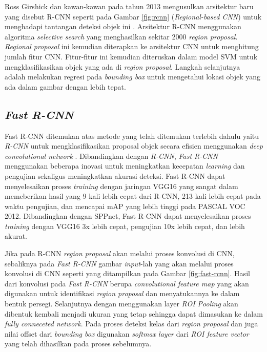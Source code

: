 Ross Girshick dan kawan-kawan pada tahun 2013 mengusulkan arsitektur baru yang disebut R-CNN seperti pada Gambar \ref{fig:rcnn} (\textit{Regional-based CNN}) untuk menghadapi tantangan deteksi objek ini \citep{rcnn}. Arsitektur R-CNN menggunakan algoritma \textit{selective search} yang menghasilkan sekitar 2000 \textit{region proposal}. \textit{Regional proposal} ini kemudian diterapkan ke arsitektur CNN untuk menghitung jumlah fitur CNN. Fitur-fitur ini kemudian diteruskan dalam model SVM untuk mengklasifikasikan objek yang ada di \textit{region proposal}. Langkah selanjutnya adalah melakukan regresi pada \textit{bounding box} untuk mengetahui lokasi objek yang ada dalam gambar dengan lebih tepat. 

\subsection{\textit{Fast R-CNN}}
\label{subsec:fast-rcnn}

Fast R-CNN ditemukan atas metode yang telah ditemukan terlebih dahulu yaitu \textit{R-CNN} untuk mengklasifikasikan proposal objek secara efisien menggunakan \textit{deep convolutional network} \citep{fast-rcnn}. Dibandingkan dengan \textit{R-CNN}, \textit{Fast R-CNN} menggunakan beberapa inovasi untuk meningkatkan kecepatan \textit{learning} dan pengujian sekaligus meningkatkan akurasi deteksi. Fast R-CNN dapat menyelesaikan proses \textit{training} dengan jaringan VGG16 yang sangat dalam memeberikan hasil yang 9 kali lebih cepat dari R-CNN, 213 kali lebih cepat pada waktu pengujian, dan mencapai mAP yang lebih tinggi pada PASCAL VOC 2012. Dibandingkan dengan SPPnet, Fast R-CNN dapat menyelesaikan proses \textit{training} dengan VGG16 3x lebih cepat, pengujian 10x lebih cepat, dan lebih akurat.

Jika pada R-CNN \textit{region proposal} akan melalui proses konvolusi di CNN, sebaliknya pada \textit{Fast R-CNN} gambar \textit{input}-lah yang akan melalui proses konvolusi di CNN seperti yang ditampilkan pada Gambar \ref{fig:fast-rcnn}. Hasil dari konvolusi pada \textit{Fast R-CNN} berupa \textit{convolutional feature map} yang akan digunakan untuk identifikasi \textit{region proposal} dan menyatukannya ke dalam bentuk persegi. Selanjutnya dengan menggunakan layer \textit{ROI Pooling} akan dibentuk kembali menjadi ukuran yang tetap sehingga dapat dimasukan ke dalam \textit{fully conneceted network}. Pada proses deteksi kelas dari \textit{region proposal} dan juga nilai offset dari \textit{bounding box} digunakan \textit{softmax layer} dari \textit{ROI feature vector} yang telah dihasilkan pada proses sebelumnya.

